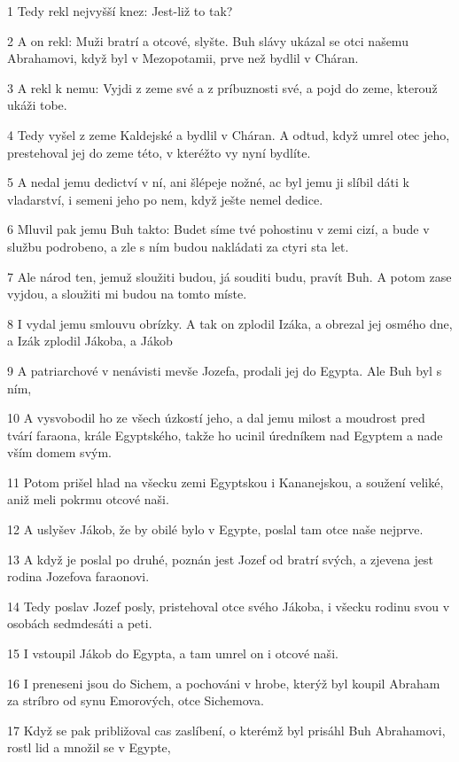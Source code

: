 \par 1 Tedy rekl nejvyšší knez: Jest-liž to tak?
\par 2 A on rekl: Muži bratrí a otcové, slyšte. Buh slávy ukázal se otci našemu Abrahamovi, když byl v Mezopotamii, prve než bydlil v Cháran.
\par 3 A rekl k nemu: Vyjdi z zeme své a z príbuznosti své, a pojd do zeme, kterouž ukáži tobe.
\par 4 Tedy vyšel z zeme Kaldejské a bydlil v Cháran. A odtud, když umrel otec jeho, prestehoval jej do zeme této, v kteréžto vy nyní bydlíte.
\par 5 A nedal jemu dedictví v ní, ani šlépeje nožné, ac byl jemu ji slíbil dáti k vladarství, i semeni jeho po nem, když ješte nemel dedice.
\par 6 Mluvil pak jemu Buh takto: Budet síme tvé pohostinu v zemi cizí, a bude v službu podrobeno, a zle s ním budou nakládati za ctyri sta let.
\par 7 Ale národ ten, jemuž sloužiti budou, já souditi budu, pravít Buh. A potom zase vyjdou, a sloužiti mi budou na tomto míste.
\par 8 I vydal jemu smlouvu obrízky. A tak on zplodil Izáka, a obrezal jej osmého dne, a Izák zplodil Jákoba, a Jákob
\par 9 A patriarchové v nenávisti mevše Jozefa, prodali jej do Egypta. Ale Buh byl s ním,
\par 10 A vysvobodil ho ze všech úzkostí jeho, a dal jemu milost a moudrost pred tvárí faraona, krále Egyptského, takže ho ucinil úredníkem nad Egyptem a nade vším domem svým.
\par 11 Potom prišel hlad na všecku zemi Egyptskou i Kananejskou, a soužení veliké, aniž meli pokrmu otcové naši.
\par 12 A uslyšev Jákob, že by obilé bylo v Egypte, poslal tam otce naše nejprve.
\par 13 A když je poslal po druhé, poznán jest Jozef od bratrí svých, a zjevena jest rodina Jozefova faraonovi.
\par 14 Tedy poslav Jozef posly, pristehoval otce svého Jákoba, i všecku rodinu svou v osobách sedmdesáti a peti.
\par 15 I vstoupil Jákob do Egypta, a tam umrel on i otcové naši.
\par 16 I preneseni jsou do Sichem, a pochováni v hrobe, kterýž byl koupil Abraham za stríbro od synu Emorových, otce Sichemova.
\par 17 Když se pak približoval cas zaslíbení, o kterémž byl prisáhl Buh Abrahamovi, rostl lid a množil se v Egypte,
